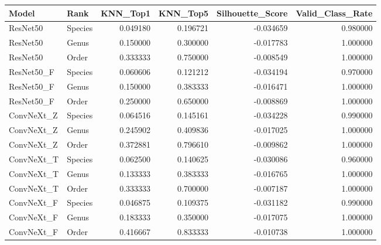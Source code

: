 \begin{tabular}{llrrrr}
\toprule
Model & Rank & KNN_Top1 & KNN_Top5 & Silhouette_Score & Valid_Class_Rate \\
\midrule
ResNet50 & Species & 0.049180 & 0.196721 & -0.034659 & 0.980000 \\
ResNet50 & Genus & 0.150000 & 0.300000 & -0.017783 & 1.000000 \\
ResNet50 & Order & 0.333333 & 0.750000 & -0.008549 & 1.000000 \\
ResNet50_F & Species & 0.060606 & 0.121212 & -0.034194 & 0.970000 \\
ResNet50_F & Genus & 0.150000 & 0.383333 & -0.016471 & 1.000000 \\
ResNet50_F & Order & 0.250000 & 0.650000 & -0.008869 & 1.000000 \\
ConvNeXt_Z & Species & 0.064516 & 0.145161 & -0.034228 & 0.990000 \\
ConvNeXt_Z & Genus & 0.245902 & 0.409836 & -0.017025 & 1.000000 \\
ConvNeXt_Z & Order & 0.372881 & 0.796610 & -0.009862 & 1.000000 \\
ConvNeXt_T & Species & 0.062500 & 0.140625 & -0.030086 & 0.960000 \\
ConvNeXt_T & Genus & 0.133333 & 0.383333 & -0.016765 & 1.000000 \\
ConvNeXt_T & Order & 0.333333 & 0.700000 & -0.007187 & 1.000000 \\
ConvNeXt_F & Species & 0.046875 & 0.109375 & -0.031182 & 0.990000 \\
ConvNeXt_F & Genus & 0.183333 & 0.350000 & -0.017075 & 1.000000 \\
ConvNeXt_F & Order & 0.416667 & 0.833333 & -0.010738 & 1.000000 \\
\bottomrule
\end{tabular}
